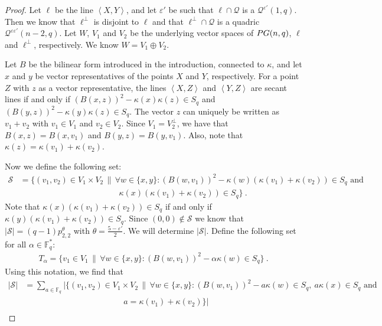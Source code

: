 \documentclass[a4paper]{article}
\theoremstyle{definition}
\newcommand{\eps}{\varepsilon}
\newcommand{\FF}{\mathbb F}
\newcommand{\vspan}[1]{\left \langle #1 \right \rangle}
\newcommand{\pg}{\textnormal{PG}}
\newcommand{\mq}{\mathcal Q}
\begin{document}
\begin{proof}
    Let $\ell$ be the line $\vspan{X,Y}$, and let $\eps'$ be such that $\ell\cap\mq$ is a $\mq^{\eps'}(1,q)$. Then we know that $\ell^{\perp}$ is disjoint to $\ell$ and that $\ell^{\perp}\cap\mq$ is a quadric $\mq^{\eps\eps'}(n-2,q)$. Let $W$, $V_{1}$ and $V_{2}$ be the underlying vector spaces of $\pg(n,q)$, $\ell$ and $\ell^{\perp}$, respectively. We know $W=V_{1}\oplus V_{2}$.
    \par Let $B$ be the bilinear form introduced in the introduction, connected to $\kappa$, and let $x$ and $y$ be vector representatives of the points $X$ and $Y$, respectively.
    For a point $Z$ with $z$ as a vector representative, the lines $\vspan{X,Z}$ and $\vspan{Y,Z}$ are secant lines if and only if $(B(x,z))^{2}-\kappa(x)\kappa(z)\in S_{q}$ and $(B(y,z))^{2}-\kappa(y)\kappa(z)\in S_{q}$. The vector $z$ can uniquely be written as $v_{1}+v_{2}$ with $v_{1}\in V_{1}$ and $v_{2}\in V_{2}$. Since $V_{1}=V_{2}^{\perp}$, we have that $B(x,z)=B(x,v_{1})$ and $B(y,z)=B(y,v_{1})$. Also, note that $\kappa(z)=\kappa(v_{1})+\kappa(v_{2})$.
    \par Now we define the following set:
    \begin{align*}
        \mathcal{S}&=\{(v_{1},v_{2})\in V_{1}\times V_{2}\, \| \, \forall w\in\{x,y\}:(B(w,v_{1}))^{2}-\kappa(w)(\kappa(v_{1})+\kappa(v_{2}))\in S_{q}\text{ and }\\&\qquad\qquad\qquad\qquad\qquad\qquad \kappa(x)(\kappa(v_{1})+\kappa(v_{2}))\in S_{q}\}\:.%
    \end{align*}
    Note that $\kappa(x)(\kappa(v_{1})+\kappa(v_{2}))\in S_{q}$ if and only if $\kappa(y)(\kappa(v_{1})+\kappa(v_{2}))\in S_{q}$. Since $(0,0)\notin\mathcal{S}$ we know that $|\mathcal{S}|=(q-1)p^{\theta}_{2,2}$ with $\theta=\frac{5-\eps'}{2}$. We will determine $|\mathcal{S}|$.
    Define the following set for all $\alpha\in\FF_{q}^{*}$:
    \begin{align*}
        T_{\alpha}=\{v_{1}\in V_{1}\, \| \, \forall w\in\{x,y\}:(B(w,v_{1}))^{2}-\alpha\kappa(w)\in S_{q}\}\:.
    \end{align*}
    Using this notation, we find that
    { \allowdisplaybreaks \begin{align*}
        |\mathcal{S}|&=\sum_{a\in\FF_{q}}|\{(v_{1},v_{2})\in V_{1}\times V_{2}\, \| \,\forall w\in\{x,y\}:(B(w,v_{1}))^{2}-a\kappa(w)\in S_{q},\ a\kappa(x)\in S_{q}\text{ and }\\&\qquad\qquad\qquad\qquad\qquad\qquad a=\kappa(v_{1})+\kappa(v_{2})\}|\\

\end{align*}}
\end{proof}
\end{document}
